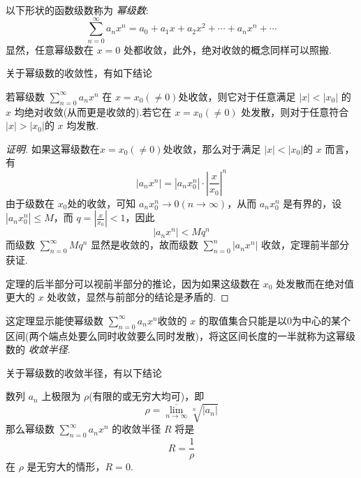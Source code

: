 以下形状的函数级数称为 \emph{幂级数}:
\[ \sum_{n=0}^{\infty} a_nx^n = a_0+a_1x+a_2x^2+\cdots + a_nx^n+\cdots \]
显然，任意幂级数在 $x=0$ 处都收敛，此外，绝对收敛的概念同样可以照搬.

关于幂级数的收敛性，有如下结论
\begin{theorem}
  若幂级数 $\sum_{n=0}^{\infty}a_nx^n$ 在 $x=x_0(\neq 0)$处收敛，则它对于任意满足 $|x|<|x_0|$ 的 $x$ 均绝对收敛(从而更是收敛的).若它在 $x=x_0(\neq 0)$ 处发散，则对于任意符合 $|x|>|x_0|$的 $x$ 均发散.
\end{theorem}

\begin{proof}[证明]
  如果这幂级数在$x=x_0(\neq 0)$处收敛，那么对于满足 $|x|<|x_0|$的 $x$ 而言，有
  \[ |a_nx^n| = |a_nx_0^n| \cdot \left| \frac{x}{x_0} \right|^n \]
  由于级数在 $x_0$处的收敛，可知 $a_nx_0^n \to 0 (n \to \infty)$，从而 $a_nx_0^n$ 是有界的，设 $|a_nx_0^n| \leqslant M$，而 $q=\left| \frac{x}{x_0} \right| < 1$，因此
  \[ |a_nx^n| < Mq^n \]
  而级数 $\sum_{n=0}^{\infty} Mq^n$ 显然是收敛的，故而级数 $\sum_{n=0}^n|a_nx^n|$ 收敛，定理前半部分获证.

  定理的后半部分可以视前半部分的推论，因为如果这级数在 $x_0$ 处发散而在绝对值更大的 $x$ 处收敛，显然与前部分的结论是矛盾的.
\end{proof}

这定理显示能使幂级数 $\sum_{n=0}^{\infty} a_nx^n$收敛的 $x$ 的取值集合只能是以$0$为中心的某个区间(两个端点处要么同时收敛要么同时发散)，将这区间长度的一半就称为这幂级数的 \emph{收敛半径}.

关于幂级数的收敛半径，有以下结论
\begin{theorem}
  数列 ${a_n}$ 上极限为 $\rho$(有限的或无穷大均可)，即
  \[ \rho = \overline{\lim_{n\to\infty}} \sqrt[n]{|a_n|} \]
  那么幂级数 $\sum_{n=0}^{\infty} a_nx^n$ 的收敛半径 $R$ 将是
  \[ R = \frac{1}{\rho} \]
  在 $\rho$ 是无穷大的情形，$R=0$.
\end{theorem}

